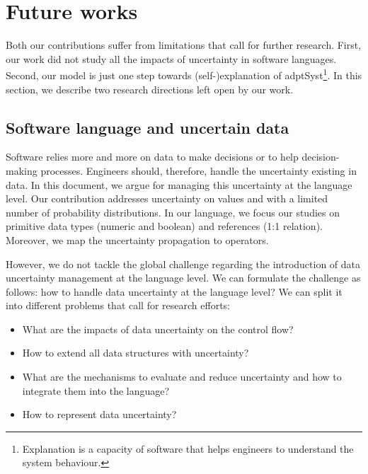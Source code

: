 \section{Future works}

Both our contributions suffer from limitations that call for further research.
First, our work did not study all the impacts of uncertainty in software languages.
Second, our model is just one step towards (self-)explanation of \gls{adptSyst}\footnote{Explanation is a capacity of software that helps engineers to understand the system behaviour.}.
In this section, we describe two research directions left open by our work.

\subsection{Software language and uncertain data}
Software relies more and more on data to make decisions or to help decision-making processes.
Engineers should, therefore, handle the uncertainty existing in data.
In this document, we argue for managing this uncertainty at the language level.
Our contribution addresses uncertainty on values and with a limited number of probability distributions.
In our language, we focus our studies on primitive data types (numeric and boolean) and references (1:1 relation).
Moreover, we map the uncertainty propagation to operators.

However, we do not tackle the global challenge regarding the introduction of data uncertainty management at the language level.
We can formulate the challenge as follows: how to handle data uncertainty at the language level?
We can split it into different problems that call for research efforts:
\begin{itemize}
	\item What are the impacts of data uncertainty on the control flow?
	\item How to extend all data structures with uncertainty?
	\item What are the mechanisms to evaluate and reduce uncertainty and how to integrate them into the language?
	\item How to represent data uncertainty?
\end{itemize}

